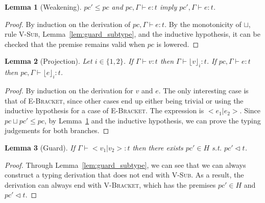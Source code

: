 \documentclass[a4paper]{article}
\newcommand{\typeRule}[3]{#1 \vdash #2 \colon #3}
\newcommand{\guards}[0]{\lhd}
\newcommand{\lift}[1]{\lfloor #1 \rfloor}
\theoremstyle{plain}
\newtheorem{lemma}{Lemma}
\theoremstyle{definition}
\begin{document}
\begin{lemma}[Weakening]
  \label{lem:weakening}
  $pc' \leq pc$ and $\typeRule{pc, \Gamma}{e}{t}$ imply $\typeRule{pc',
  \Gamma}{e}{t}$.
\end{lemma}
\begin{proof}
  By induction on the derivation of $\typeRule{pc, \Gamma}{e}{t}$.  By the
  monotonicity of $\sqcup$, rule \textsc{V-Sub}, Lemma~\ref{lem:guard_subtype},
  and the inductive hypothesis, it can be checked that the premise remains valid
  when $pc$ is lowered.
\end{proof}

\begin{lemma}[Projection]
  \label{lem:projection}
  Let $i \in \{1, 2\}$.  If $\typeRule{\Gamma}{v}{t}$ then
  $\typeRule{\Gamma}{\lift{v}_i}{t}$.  If $\typeRule{pc, \Gamma}{e}{t}$ then
  $\typeRule{pc, \Gamma}{\lift{e}_i}{t}$.
\end{lemma}
\begin{proof}
  By induction on the derivation for $v$ and $e$.  The only interesting case is
  that of \textsc{E-Bracket}, since other cases end up either being trivial or
  using the inductive hypothesis for a case of \textsc{E-Bracket}.  The
  expression is $<e_1 | e_2>$.  Since $pc \sqcup pc' \leq pc$, by
  Lemma~\ref{lem:weakening} and the inductive hypothesis, we can prove the
  typing judgements for both branches.
\end{proof}

\begin{lemma}[Guard]
  \label{lem:guard}
  If $\typeRule{\Gamma}{< v_1 | v_2 >}{t}$ then there exists $pc' \in H$ s.t.
  $pc' \guards t$.
\end{lemma}
\begin{proof}
  Through Lemma~\ref{lem:guard_subtype}, we can see that we can always construct
  a typing derivation that does not end with \textsc{V-Sub}.  As a result, the
  derivation can always end with \textsc{V-Bracket}, which has the premises $pc'
  \in H$ and $pc' \guards t$.
\end{proof}
\end{document}
